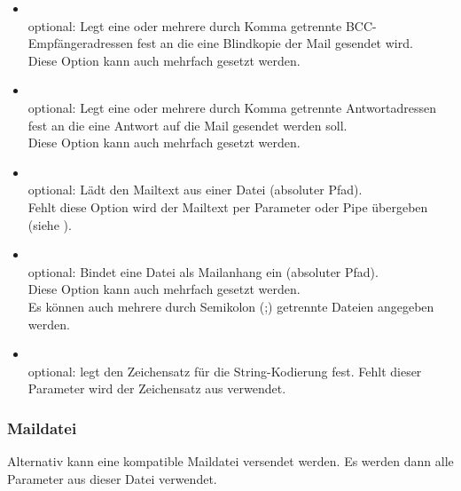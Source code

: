 \begin {itemize}
  \item [\var{-b},]  
    \\optional: Legt eine oder mehrere durch Komma getrennte
    BCC-Empfängeradressen fest an die eine Blindkopie der Mail gesendet wird.
    \\ Diese Option kann auch mehrfach gesetzt werden.

  \item [\var{-r},]  
    \\optional: Legt eine oder mehrere durch Komma getrennte
    Antwortadressen fest an die eine Antwort auf die Mail gesendet werden soll.
    \\ Diese Option kann auch mehrfach gesetzt werden.

  \item [\var{-B},]  
    \\optional: Lädt den Mailtext aus einer Datei (absoluter Pfad).
    \\Fehlt diese Option wird der Mailtext per Parameter oder Pipe übergeben 
    (siehe ).

  \item [\var{-a},]  
    \\optional: Bindet eine Datei als Mailanhang ein (absoluter Pfad).
    \\ Diese Option kann auch mehrfach gesetzt werden.
    \\ Es können auch mehrere durch Semikolon (;) getrennte Dateien 
    angegeben werden.
  
  \item [\var{-C},]  
    \\optional: legt den Zeichensatz für die String-Kodierung
    fest. Fehlt dieser Parameter wird der Zeichensatz aus 
     verwendet.
\end{itemize}

\subsubsection{ Maildatei}
    Alternativ kann eine  kompatible
    Maildatei versendet werden. Es werden dann alle Parameter aus dieser 
    Datei verwendet. 
    
